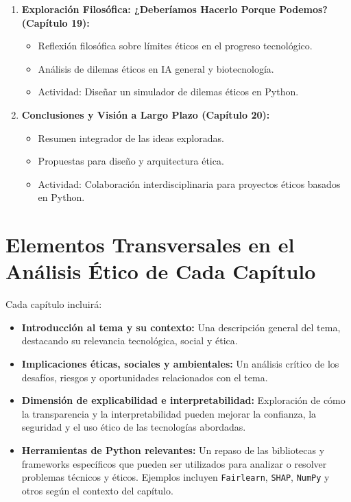 \begin{refsection}
\begin{enumerate}
\item \textbf{Exploración Filosófica: ¿Deberíamos Hacerlo Porque Podemos? (Capítulo 19):}  
\begin{itemize}
    \item Reflexión filosófica sobre límites éticos en el progreso tecnológico.
    \item Análisis de dilemas éticos en IA general y biotecnología.
    \item Actividad: Diseñar un simulador de dilemas éticos en Python.
\end{itemize}

\item \textbf{Conclusiones y Visión a Largo Plazo (Capítulo 20):}  
\begin{itemize}
    \item Resumen integrador de las ideas exploradas.
    \item Propuestas para diseño y arquitectura ética.
    \item Actividad: Colaboración interdisciplinaria para proyectos éticos basados en Python.
\end{itemize}
\end{enumerate}



\section{Elementos Transversales en el Análisis Ético de Cada Capítulo}

Cada capítulo incluirá:

\begin{itemize}
    \item \textbf{Introducción al tema y su contexto:} 
    Una descripción general del tema, destacando su relevancia tecnológica, social y ética.
    
    \item \textbf{Implicaciones éticas, sociales y ambientales:} 
    Un análisis crítico de los desafíos, riesgos y oportunidades relacionados con el tema. 
    
    \item \textbf{Dimensión de explicabilidad e interpretabilidad:} 
    Exploración de cómo la transparencia y la interpretabilidad pueden mejorar la confianza, la seguridad y el uso ético de las tecnologías abordadas.
    
    \item \textbf{Herramientas de Python relevantes:} 
    Un repaso de las bibliotecas y frameworks específicos que pueden ser utilizados para analizar o resolver problemas técnicos y éticos. Ejemplos incluyen \texttt{Fairlearn}, \texttt{SHAP}, \texttt{NumPy} y otros según el contexto del capítulo.
    

\end{itemize}
\end{refsection}

